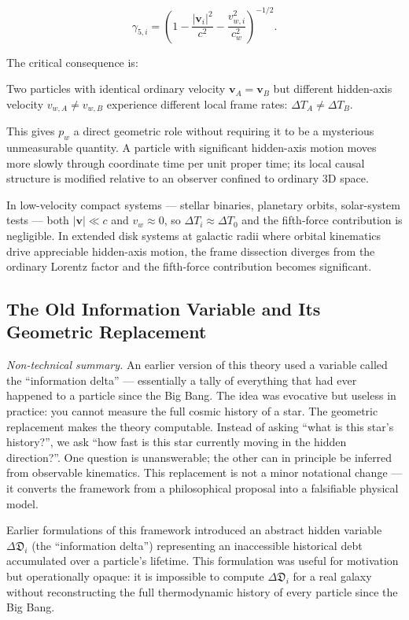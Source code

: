 \documentclass[11pt,a4paper]{article}
\newcommand{\pw}{p_w}                        %
\newcommand{\InfoD}{\Delta\mathfrak{D}}      %
\begin{document}
\[
  \gamma_{5,i}
  = \left(1 - \frac{|\mathbf{v}_i|^2}{c^2} - \frac{v_{w,i}^2}{c_w^2}\right)^{-1/2} .
\]

The critical consequence is:

\begin{keybox}
\centering
Two particles with identical ordinary velocity $\mathbf{v}_A = \mathbf{v}_B$
but different hidden-axis velocity $v_{w,A} \neq v_{w,B}$ experience
different local frame rates: $\Delta T_A \neq \Delta T_B$.
\end{keybox}

\noindent
This gives $\pw$ a direct geometric role without requiring it to be
a mysterious unmeasurable quantity.  A particle with significant hidden-axis
motion moves more slowly through coordinate time per unit proper time; its
local causal structure is modified relative to an observer confined to
ordinary 3D space.

In low-velocity compact systems --- stellar binaries, planetary orbits,
solar-system tests --- both $|\mathbf{v}| \ll c$ and $v_w \approx 0$, so
$\Delta T_i \approx \Delta T_0$ and the fifth-force contribution is
negligible.  In extended disk systems at galactic radii where orbital
kinematics drive appreciable hidden-axis motion, the frame dissection
diverges from the ordinary Lorentz factor and the fifth-force contribution
becomes significant.

\subsection{The Old Information Variable and Its Geometric Replacement}

\textit{Non-technical summary.}\enspace
An earlier version of this theory used a variable called the ``information
delta'' --- essentially a tally of everything that had ever happened to a
particle since the Big Bang.  The idea was evocative but useless in practice:
you cannot measure the full cosmic history of a star.  The geometric
replacement makes the theory computable.  Instead of asking ``what is this
star's history?'', we ask ``how fast is this star currently moving in the
hidden direction?''.  One question is unanswerable; the other can in principle
be inferred from observable kinematics.  This replacement is not a minor
notational change --- it converts the framework from a philosophical proposal
into a falsifiable physical model.

Earlier formulations of this framework introduced an abstract hidden variable
$\InfoD_i$ (the ``information delta'') representing an inaccessible historical
debt accumulated over a particle's lifetime.  This formulation was useful for
motivation but operationally opaque: it is impossible to compute $\InfoD_i$
for a real galaxy without reconstructing the full thermodynamic history of
every particle since the Big Bang.
\end{document}
